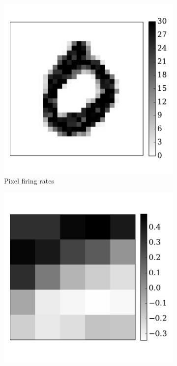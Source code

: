 	\begin{figure}[bt!]
		\centering
		\begin{subfigure}[t]{0.3\textwidth}
			\includegraphics[width=\textwidth]{pics_iconip/6-2.pdf}
		    \caption{Pixel firing rates}
		    \label{Fig:62}
		\end{subfigure}
		\begin{subfigure}[t]{0.3\textwidth}
			\includegraphics[width=\textwidth]{pics_iconip/6-3.pdf}

\end{subfigure}
\end{figure}
